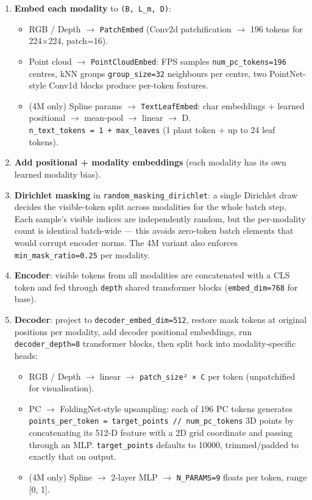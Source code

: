 \documentclass[
  10pt,
]{article}
\providecommand{\tightlist}{%
  \setlength{\itemsep}{0pt}\setlength{\parskip}{0pt}}
\begin{document}
\begin{enumerate}
\def\labelenumi{\arabic{enumi}.}
\tightlist
\item
  \textbf{Embed each modality} to \texttt{(B,\ L\_m,\ D)}:

  \begin{itemize}
  \tightlist
  \item
    RGB / Depth \(\to\) \texttt{PatchEmbed} (Conv2d patchification
    \(\to\) 196 tokens for 224×224, patch=16).
  \item
    Point cloud \(\to\) \texttt{PointCloudEmbed}: FPS samples
    \texttt{num\_pc\_tokens=196} centres, kNN groups
    \texttt{group\_size=32} neighbours per centre, two PointNet-style
    Conv1d blocks produce per-token features.
  \item
    (4M only) Spline params \(\to\) \texttt{TextLeafEmbed}: char
    embeddings + learned positional \(\to\) mean-pool \(\to\) linear
    \(\to\) D. \texttt{n\_text\_tokens\ =\ 1\ +\ max\_leaves} (1 plant
    token + up to 24 leaf tokens).
  \end{itemize}
\item
  \textbf{Add positional + modality embeddings} (each modality has its
  own learned modality bias).
\item
  \textbf{Dirichlet masking} in \texttt{random\_masking\_dirichlet}: a
  single Dirichlet draw decides the visible-token split across
  modalities for the whole batch step. Each sample's visible indices are
  independently random, but the per-modality count is identical
  batch-wide --- this avoids zero-token batch elements that would
  corrupt encoder norms. The 4M variant also enforces
  \texttt{min\_mask\_ratio=0.25} per modality.
\item
  \textbf{Encoder}: visible tokens from all modalities are concatenated
  with a CLS token and fed through \texttt{depth} shared transformer
  blocks (\texttt{embed\_dim=768} for base).
\item
  \textbf{Decoder}: project to \texttt{decoder\_embed\_dim=512}, restore
  mask tokens at original positions per modality, add decoder positional
  embeddings, run \texttt{decoder\_depth=8} transformer blocks, then
  split back into modality-specific heads:

  \begin{itemize}
  \tightlist
  \item
    RGB / Depth \(\to\) linear \(\to\) \texttt{patch\_size²\ ×\ C} per
    token (unpatchified for visualisation).
  \item
    PC \(\to\) FoldingNet-style upsampling: each of 196 PC tokens
    generates
    \texttt{points\_per\_token\ =\ target\_points\ //\ num\_pc\_tokens}
    3D points by concatenating its 512-D feature with a 2D grid
    coordinate and passing through an MLP. \texttt{target\_points}
    defaults to 10000, trimmed/padded to exactly that on output.
  \item
    (4M only) Spline \(\to\) 2-layer MLP \(\to\) \texttt{N\_PARAMS=9}
    floats per token, range {[}0, 1{]}.
  \end{itemize}
\end{enumerate}
\end{document}

